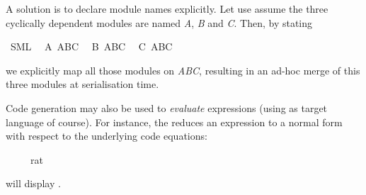 \begin{isabellebody}
\begin{isamarkuptext}
  A solution is to declare module names explicitly.
  Let use assume the three cyclically dependent
  modules are named \emph{A}, \emph{B} and \emph{C}.
  Then, by stating%
\end{isamarkuptext}%
\isamarkuptrue%
%
\isadelimquote
%
\endisadelimquote
%
\isatagquote
{}\isamarkupfalse%
\ SML\isanewline
\ \ A\ ABC\isanewline
\ \ B\ ABC\isanewline
\ \ C\ ABC%
\endisatagquote
{\isafoldquote}%
%
\isadelimquote
%
\endisadelimquote
%
\begin{isamarkuptext}%
\noindent
  we explicitly map all those modules on \emph{ABC},
  resulting in an ad-hoc merge of this three modules
  at serialisation time.%
\end{isamarkuptext}%
\isamarkuptrue%
%
\isamarkuptrue%
%
\begin{isamarkuptext}%
Code generation may also be used to \emph{evaluate} expressions
  (using  as target language of course).
  For instance, the \hyperlink{command.value}{\mbox{}} reduces an expression to a
  normal form with respect to the underlying code equations:%
\end{isamarkuptext}%
\isamarkuptrue%
%
\isadelimquote
%
\endisadelimquote
%
\isatagquote
{}\isamarkupfalse%
\ {\isachardoublequoteopen}{}{}\ {\isacharslash}\ {\isacharparenleft}{}{}\ {\isacharcolon}{\isacharcolon}\ rat{\isacharparenright}{\isachardoublequoteclose}%
\endisatagquote
{\isafoldquote}%
%
\isadelimquote
%
\endisadelimquote
%
\begin{isamarkuptext}%
\noindent will display .


\end{isamarkuptext}
\end{isabellebody}
